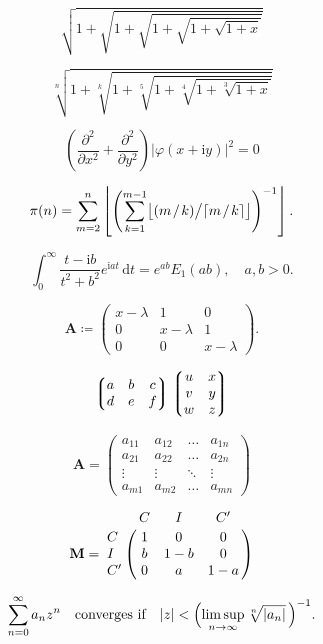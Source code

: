 \documentclass[12pt, a4paper, oneside]{article}
\newcommand{\mathup}[1]{\mathrm{#1}}
\newcommand*{\divslash}{%
	\mathbin{%
		\nonscript\mskip-2mu / \nonscript\mskip-2mu%
	}%
}  %
\theoremstyle{Plain}
\theoremstyle{Definition}
\theoremstyle{Remark}
\begin{document}
\begin{appendix}

$$\sqrt{1+\sqrt{1+\sqrt{1+\sqrt{1+\sqrt{1+x}}}}}$$

$$\sqrt[n]{1+\sqrt[k]{1+\sqrt[5]{1+\sqrt[4]{1+\sqrt[3]{1+x}}}}}$$


$$\left(\frac{\partial^2}{\partial x^2} + \frac{\partial^2}{\partial y^2}\right)
\bigl|\varphi(x+\mathup{i}y)\bigr|^2=0$$



$$\pi(n)=\sum_{m=2}^n\left\lfloor\Biggl(\sum_{k=1}^{m-1}\bigl
\lfloor(m \divslash k) \big/ \lceil m \divslash k\rceil\bigr\rfloor\Biggr)^{-1}\right\rfloor.$$


$$\int_0^\infty \frac{t - \mathup{i} b}{t^2 + b^2}e^{\mathup{i}at}\,\mathup{d}t=e^{ab}E_1(ab), \quad
a,b > 0.$$


$$\mathbf{A} \coloneq \begin{pmatrix}x-\lambda&1&0\\
0&x-\lambda&1\\
0&0&x-\lambda\end{pmatrix}.$$

$$\left\lgroup\begin{matrix}a&b&c\\ d&e&f\\\end{matrix}\right\rgroup
\left\lgroup\begin{matrix}u&x\cr v&y\cr w&z\end{matrix}\right\rgroup$$


$$\mathbf{A} = \begin{pmatrix}a_{11}&a_{12}&\ldots&a_{1n}\\
a_{21}&a_{22}&\ldots&a_{2n}\\
\vdots&\vdots&\ddots&\vdots\\
a_{m1}&a_{m2}&\ldots&a_{mn}\end{pmatrix}$$

$$\mathbf{M}=\bordermatrix{&C&I&C'\cr
	C&1&0&0\cr I&b&1-b&0\cr C'&0&a&1-a}$$


$$\sum_{n=0}^\infty a_nz^n\quad\hbox{converges if}\quad
|z|<\Bigl(\limsup_{n\to\infty}\root n\of{|a_n|}\,\Bigr)^{-1}.$$


\end{appendix}
\end{document}
